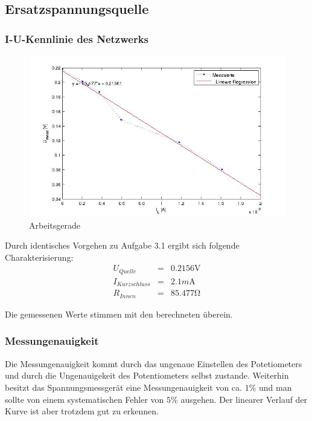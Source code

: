 \documentclass[10pt]{report}
\begin{document}
        \subsection{Ersatzspannungsquelle}
        \subsubsection{I-U-Kennlinie des Netzwerks}
        \begin{center}
            \begin{figure}[H]
              \includegraphics[width=\textwidth]{ErsatzspannungsQuelle.jpg}
              \caption{Arbeitsgerade}
            \end{figure}
        \end{center}

        Durch identisches Vorgehen zu Aufgabe 3.1 ergibt sich folgende
        Charakterisierung:
        \begin{eqnarray*}
            U_{Quelle} &=& 0.2156\si{\volt}\\
            I_{Kurzschluss} &=& 2.1\si{m\ampere}\\
            R_{Innen} &=& 85.477\si{\ohm}
        \end{eqnarray*}

		\vspace{0.5cm}

		Die gemessenen Werte stimmen mit den berechneten überein.


        \subsubsection{Messungenauigkeit}
        Die Messungenauigkeit kommt durch das ungenaue Einstellen des Potetiometers
        und durch die Ungenauigekeit des Potentiometers selbst zustande. Weiterhin besitzt
		das Spannungsmessgerät eine Messungenauigkeit von ca. $1\%$ und man sollte von einem
		systematischen Fehler von $5\%$ ausgehen. Der linearer Verlauf der Kurve ist aber
		trotzdem gut zu erkennen.
\end{document}
